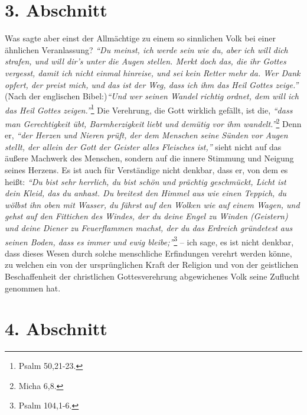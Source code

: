 \section{3. Abschnitt} \label{kap5_ab3}


Was sagte aber einst der Allmächtige zu einem so
sinnlichen Volk bei einer ähnlichen Veranlassung?
\textit{"`Du meinst, ich werde sein wie du, aber ich will dich
strafen, und will dir’s unter die Augen stellen. Merkt doch das, die ihr Gottes
vergesst, damit ich nicht einmal hinreise, und sei kein Retter mehr da. Wer
Dank opfert, der preist mich, und das ist der Weg, dass ich ihm das Heil
Gottes zeige."'} (Nach der englischen Bibel:)\textit{"`Und wer seinen Wandel
richtig
ordnet, dem will ich das Heil Gottes zeigen."'}\footnote{Psalm 50,21-23.}
Die Verehrung, die Gott wirklich gefällt, ist die, \label{Rechtfertigung}
\textit{"`dass man Gerechtigkeit übt, Barmherzigkeit liebt und demütig vor ihm
wandelt."'}\footnote{Micha 6,8.}
Denn er,
\textit{"`der Herzen und Nieren prüft, der dem Menschen seine Sünden vor Augen
stellt, der allein der Gott der Geister alles Fleisches ist,"'} sieht nicht
auf das äußere Machwerk des Menschen, sondern auf die innere Stimmung und
Neigung seines Herzens. Es ist auch für Verständige nicht denkbar, dass er, von
dem es heißt:
\textit{"`Du bist sehr herrlich, du bist schön und prächtig geschmückt,
Licht ist dein Kleid, das du anhast. Du breitest den Himmel aus wie einen
Teppich, du wölbst ihn oben mit Wasser, du fährst auf den Wolken wie auf
einem Wagen, und gehst auf den Fittichen des Windes, der du deine Engel zu
Winden (Geistern) und deine Diener zu Feuerflammen machst, der du das Erdreich
gründetest aus seinen Boden, dass es immer und ewig bleibe;"'}\footnote{Psalm
104,1-6.}
-- ich sage, es ist nicht denkbar, dass dieses Wesen durch solche
menschliche Erfindungen verehrt werden könne, zu welchen ein von der
ursprünglichen Kraft der Religion und von der geistlichen Beschaffenheit der
christlichen Gottesverehrung abgewichenes Volk seine Zuflucht genommen hat.

\section{4. Abschnitt} \label{kap5_ab4}

